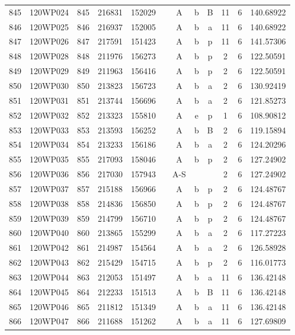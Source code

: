 \begin{tabular}{|*{12}{c|}}
845 & 120WP024 & 845 & 216831 & 152029 &  & A & b & B & 11 & 6 & 140.68922 \\ 
846 & 120WP025 & 846 & 216937 & 152005 &  & A & b & a & 11 & 6 & 140.68922 \\ 
847 & 120WP026 & 847 & 217591 & 151423 &  & A & b & p & 11 & 6 & 141.57306 \\ 
848 & 120WP028 & 848 & 211976 & 156273 &  & A & b & p & 2 & 6 & 122.50591 \\ 
849 & 120WP029 & 849 & 211963 & 156416 &  & A & b & p & 2 & 6 & 122.50591 \\ 
850 & 120WP030 & 850 & 213823 & 156723 &  & A & b & a & 2 & 6 & 130.92419 \\ 
851 & 120WP031 & 851 & 213744 & 156696 &  & A & b & a & 2 & 6 & 121.85273 \\ 
852 & 120WP032 & 852 & 213323 & 155810 &  & A & e & p & 1 & 6 & 108.90812 \\ 
853 & 120WP033 & 853 & 213593 & 156252 &  & A & b & B & 2 & 6 & 119.15894 \\ 
854 & 120WP034 & 854 & 213233 & 156186 &  & A & b & a & 2 & 6 & 124.20296 \\ 
855 & 120WP035 & 855 & 217093 & 158046 &  & A & b & p & 2 & 6 & 127.24902 \\ 
856 & 120WP036 & 856 & 217030 & 157943 &  & A-S &  &  & 2 & 6 & 127.24902 \\ 
857 & 120WP037 & 857 & 215188 & 156966 &  & A & b & p & 2 & 6 & 124.48767 \\ 
858 & 120WP038 & 858 & 214836 & 156850 &  & A & b & p & 2 & 6 & 124.48767 \\ 
859 & 120WP039 & 859 & 214799 & 156710 &  & A & b & p & 2 & 6 & 124.48767 \\ 
860 & 120WP040 & 860 & 213865 & 155299 &  & A & b & a & 2 & 6 & 117.27223 \\ 
861 & 120WP042 & 861 & 214987 & 154564 &  & A & b & a & 2 & 6 & 126.58928 \\ 
862 & 120WP043 & 862 & 215429 & 154715 &  & A & b & p & 2 & 6 & 116.01773 \\ 
863 & 120WP044 & 863 & 212053 & 151497 &  & A & b & a & 11 & 6 & 136.42148 \\ 
864 & 120WP045 & 864 & 212233 & 151513 &  & A & b & B & 11 & 6 & 136.42148 \\ 
865 & 120WP046 & 865 & 211812 & 151349 &  & A & b & a & 11 & 6 & 136.42148 \\ 
866 & 120WP047 & 866 & 211688 & 151262 &  & A & b & a & 11 & 6 & 127.69809 \\ 

\end{tabular}
